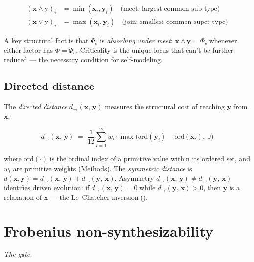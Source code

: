 \documentclass[12pt,a4paper]{article}
\newcommand{\xvec}{\mathbf{x}}
\newcommand{\yvec}{\mathbf{y}}
\newcommand{\Phic}{\Phi_c}
\newcommand{\doto}[2]{d_{\to}(#1,\,#2)}
\newcommand{\meet}{\wedge}
\newcommand{\join}{\vee}
\begin{document}
\begin{align}
  (\xvec \meet \yvec)_i &= \min(\xvec_i, \yvec_i)
    \quad\text{(meet: largest common sub-type)} \label{eq:meet} \\
  (\xvec \join \yvec)_i &= \max(\xvec_i, \yvec_i)
    \quad\text{(join: smallest common super-type)} \label{eq:join}
\end{align}

\noindent
A key structural fact is that $\Phic$ is \emph{absorbing under meet}:
$\xvec \meet \yvec = \Phic$ whenever either factor has $\Phi = \Phic$.
Criticality is the unique locus that can't be further reduced ---
the necessary condition for self-modeling.

\subsection{Directed distance}

The \emph{directed distance} $\doto{\xvec}{\yvec}$ measures the
structural cost of reaching $\yvec$ from $\xvec$:

\begin{equation}
  \doto{\xvec}{\yvec}
  \;=\; \frac{1}{12} \sum_{i=1}^{12}
  w_i \cdot \max\bigl(\text{ord}(\yvec_i) - \text{ord}(\xvec_i),\; 0\bigr)
  \label{eq:directed_distance}
\end{equation}

\noindent
where $\text{ord}(\cdot)$ is the ordinal index of a primitive value
within its ordered set, and $w_i$ are primitive weights (Methods).
The \emph{symmetric distance} is $d(\xvec, \yvec) =
\doto{\xvec}{\yvec} + \doto{\yvec}{\xvec}$. Asymmetry
$\doto{\xvec}{\yvec} \neq \doto{\yvec}{\xvec}$ identifies driven
evolution: if $\doto{\xvec}{\yvec} = 0$ while
$\doto{\yvec}{\xvec} > 0$, then $\yvec$ is a relaxation of $\xvec$
--- the Le~Chatelier inversion ().

\section{Frobenius non-synthesizability}
\label{sec:frobenius}
\noindent\emph{The gate.}\medskip
\end{document}
